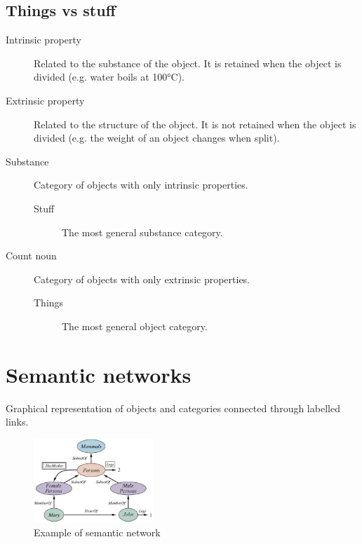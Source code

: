 \subsection{Things vs stuff}

\begin{description}
    \item[Intrinsic property] 
        Related to the substance of the object. It is retained when the object is divided
        (e.g. water boils at 100°C).

    \item[Extrinsic property] 
        Related to the structure of the object. It is not retained when the object is divided
        (e.g. the weight of an object changes when split).

    \item[Substance] 
        Category of objects with only intrinsic properties.

        \begin{description}
            \item[Stuff] 
                The most general substance category.
        \end{description}

    \item[Count noun] 
        Category of objects with only extrinsic properties.

        \begin{description}
            \item[Things] 
                The most general object category.
        \end{description}
\end{description}



\section{Semantic networks}
Graphical representation of objects and categories connected through labelled links.

\begin{figure}[h]
    \centering
    \includegraphics[width=0.4\textwidth]{img/semantic_network.png}
    \caption{Example of semantic network}
\end{figure}

